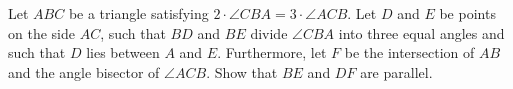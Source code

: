 Let $ABC$ be a triangle satisfying $2 \cdot \angle CBA=3 \cdot \angle ACB$.
Let $D$ and $E$ be points on the side $AC$,
such that $BD$ and $BE$ divide $\angle CBA$ into three equal angles and such that $D$ lies between $A$ and $E$.
Furthermore, let $F$ be the intersection of $AB$ and the angle bisector of $\angle ACB$.
Show that $BE$ and $DF$ are parallel.
